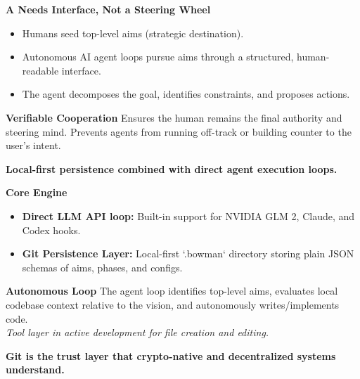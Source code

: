 \documentclass[12pt]{article}
\newcommand{\slide}[1]{%
  \clearpage
  \pagecolor{bgdark}
  \color{textlight}
  \noindent{\Large\bfseries\color{aimgold}{#1}}\par
  \vspace{0.6cm}
}
\newcommand{\col}[2]{%
  \begin{minipage}[t]{#1\textwidth}
    #2
  \end{minipage}%
}
\newcommand{\card}[2]{%
  \colorbox{bgcard}{%
    \begin{minipage}{\dimexpr#1\textwidth-2\fboxsep-2\fboxrule\relax}%
      \vspace{0.2cm}%
      \color{textlight}%
      #2%
      \vspace{0.2cm}%
    \end{minipage}%
  }%
}
\newenvironment{slideitemize}{%
  \begin{itemize}%
    \setlength{\itemsep}{4pt}%
    \setlength{\parskip}{0pt}%
    \setlength{\parsep}{0pt}%
}{%
  \end{itemize}%
}
\begin{document}
\col{0.48}{
  \textbf{A Needs Interface, Not a Steering Wheel}
  \begin{slideitemize}
    \item Humans seed top-level aims (strategic destination).
    \item Autonomous AI agent loops pursue aims through a structured, human-readable interface.
    \item The agent decomposes the goal, identifies constraints, and proposes actions.
  \end{slideitemize}
}
\hfill
\col{0.48}{
  \card{1.0}{
    \hspace{0.2cm}%
    \begin{minipage}{\dimexpr\textwidth-0.4cm\relax}
      \textbf{\color{aimcyan}Verifiable Cooperation}
      \vspace{0.2cm}
      Ensures the human remains the final authority and steering mind. Prevents agents from running off-track or building counter to the user's intent.
    \end{minipage}
  }
}

\slide{Technical Architecture: Local-First Agent Loop}
\large \textbf{Local-first persistence combined with direct agent execution loops.}
\vspace{0.8cm}
\normalsize

\col{0.48}{
  \textbf{Core Engine}
  \begin{slideitemize}
    \item \textbf{Direct LLM API loop:} Built-in support for NVIDIA GLM 2, Claude, and Codex hooks.
    \item \textbf{Git Persistence Layer:} Local-first `.bowman` directory storing plain JSON schemas of aims, phases, and configs.
  \end{slideitemize}
}
\hfill
\col{0.48}{
  \card{1.0}{
    \hspace{0.2cm}%
    \begin{minipage}{\dimexpr\textwidth-0.4cm\relax}
      \textbf{\color{aimgold}Autonomous Loop}
      \vspace{0.2cm}
      The agent loop identifies top-level aims, evaluates local codebase context relative to the vision, and autonomously writes/implements code. \\
      \textit{Tool layer in active development for file creation and editing.}
    \end{minipage}
  }
}

\slide{Why Git-Backed Matters: The Verifiability Premium}
\large \textbf{Git is the trust layer that crypto-native and decentralized systems understand.}
\vspace{0.8cm}
\normalsize
\end{document}
